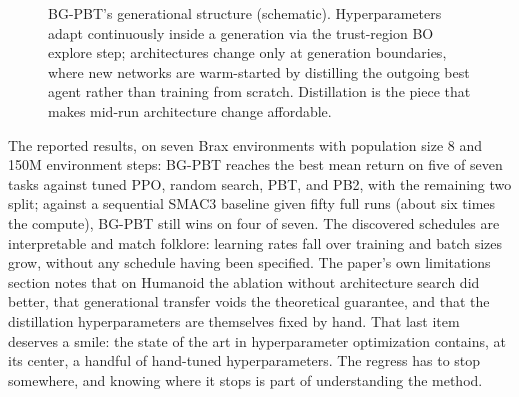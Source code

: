 \begin{figure}[t]
\centering
{}
\caption{BG-PBT's generational structure (schematic). Hyperparameters
adapt continuously inside a generation via the trust-region BO explore
step; architectures change only at generation boundaries, where new
networks are warm-started by distilling the outgoing best agent rather
than training from scratch. Distillation is the piece that makes
mid-run architecture change affordable.}
\label{fig:generations}
\end{figure}

The reported results, on seven Brax environments with population size 8
and 150M environment steps: BG-PBT reaches the best mean return on five
of seven tasks against tuned PPO, random search, PBT, and PB2, with the
remaining two split; against a sequential SMAC3 baseline given fifty
full runs (about six times the compute), BG-PBT still wins on four of
seven. The discovered schedules are interpretable and match folklore:
learning rates fall over training and batch sizes grow, without any
schedule having been specified. The paper's own limitations section
notes that on Humanoid the ablation without architecture search did
better, that generational transfer voids the theoretical guarantee, and
that the distillation hyperparameters are themselves fixed by hand. That
last item deserves a smile: the state of the art in hyperparameter
optimization contains, at its center, a handful of hand-tuned
hyperparameters. The regress has to stop somewhere, and knowing where it
stops is part of understanding the method.

